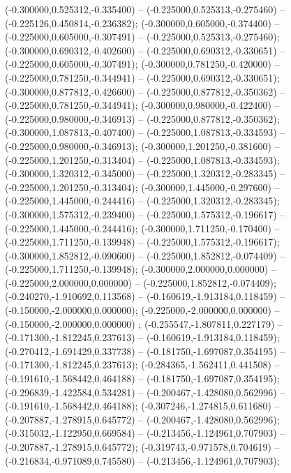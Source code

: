  (-0.300000,0.525312,-0.335400) -- (-0.225000,0.525313,-0.275460) -- (-0.225126,0.450814,-0.236382);
 (-0.300000,0.605000,-0.374400) -- (-0.225000,0.605000,-0.307491) -- (-0.225000,0.525313,-0.275460);
 (-0.300000,0.690312,-0.402600) -- (-0.225000,0.690312,-0.330651) -- (-0.225000,0.605000,-0.307491);
 (-0.300000,0.781250,-0.420000) -- (-0.225000,0.781250,-0.344941) -- (-0.225000,0.690312,-0.330651);
 (-0.300000,0.877812,-0.426600) -- (-0.225000,0.877812,-0.350362) -- (-0.225000,0.781250,-0.344941);
 (-0.300000,0.980000,-0.422400) -- (-0.225000,0.980000,-0.346913) -- (-0.225000,0.877812,-0.350362);
 (-0.300000,1.087813,-0.407400) -- (-0.225000,1.087813,-0.334593) -- (-0.225000,0.980000,-0.346913);
 (-0.300000,1.201250,-0.381600) -- (-0.225000,1.201250,-0.313404) -- (-0.225000,1.087813,-0.334593);
 (-0.300000,1.320312,-0.345000) -- (-0.225000,1.320312,-0.283345) -- (-0.225000,1.201250,-0.313404);
 (-0.300000,1.445000,-0.297600) -- (-0.225000,1.445000,-0.244416) -- (-0.225000,1.320312,-0.283345);
 (-0.300000,1.575312,-0.239400) -- (-0.225000,1.575312,-0.196617) -- (-0.225000,1.445000,-0.244416);
 (-0.300000,1.711250,-0.170400) -- (-0.225000,1.711250,-0.139948) -- (-0.225000,1.575312,-0.196617);
 (-0.300000,1.852812,-0.090600) -- (-0.225000,1.852812,-0.074409) -- (-0.225000,1.711250,-0.139948);
 (-0.300000,2.000000,0.000000) -- (-0.225000,2.000000,0.000000) -- (-0.225000,1.852812,-0.074409);
 (-0.240270,-1.910692,0.113568) -- (-0.160619,-1.913184,0.118459) -- (-0.150000,-2.000000,0.000000);
 (-0.225000,-2.000000,0.000000) -- (-0.150000,-2.000000,0.000000) ;
 (-0.255547,-1.807811,0.227179) -- (-0.171300,-1.812245,0.237613) -- (-0.160619,-1.913184,0.118459);
 (-0.270412,-1.691429,0.337738) -- (-0.181750,-1.697087,0.354195) -- (-0.171300,-1.812245,0.237613);
 (-0.284365,-1.562411,0.441508) -- (-0.191610,-1.568442,0.464188) -- (-0.181750,-1.697087,0.354195);
 (-0.296839,-1.422584,0.534281) -- (-0.200467,-1.428080,0.562996) -- (-0.191610,-1.568442,0.464188);
 (-0.307246,-1.274815,0.611680) -- (-0.207887,-1.278915,0.645772) -- (-0.200467,-1.428080,0.562996);
 (-0.315032,-1.122950,0.669584) -- (-0.213456,-1.124961,0.707903) -- (-0.207887,-1.278915,0.645772);
 (-0.319743,-0.971578,0.704619) -- (-0.216834,-0.971089,0.745580) -- (-0.213456,-1.124961,0.707903);
